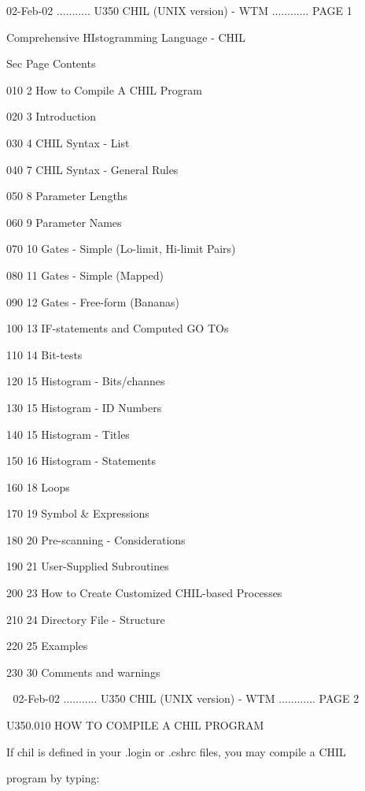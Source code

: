    02-Feb-02 ........... U350  CHIL (UNIX version) - WTM ............ PAGE   1
 
 
                   Comprehensive HIstogramming Language - CHIL
 
 
   Sec Page Contents
 
 
 
   010   2  How to Compile A CHIL Program
 
   020   3  Introduction
 
   030   4  CHIL Syntax - List
 
   040   7  CHIL Syntax - General Rules
 
   050   8  Parameter Lengths
 
   060   9  Parameter Names
 
   070  10  Gates - Simple    (Lo-limit, Hi-limit Pairs)
 
   080  11  Gates - Simple    (Mapped)
 
   090  12  Gates - Free-form (Bananas)
 
   100  13  IF-statements and Computed GO TOs
 
   110  14  Bit-tests
 
   120  15  Histogram - Bits/channes
 
   130  15  Histogram - ID Numbers
 
   140  15  Histogram - Titles
 
   150  16  Histogram - Statements
 
   160  18  Loops
 
   170  19  Symbol & Expressions
 
   180  20  Pre-scanning - Considerations
 
   190  21  User-Supplied Subroutines
 
   200  23  How to Create Customized CHIL-based Processes
 
   210  24  Directory File - Structure
 
   220  25  Examples
 
   230  30  Comments and warnings
 
    
   02-Feb-02 ........... U350  CHIL (UNIX version) - WTM ............ PAGE   2
 
 
 
   U350.010  HOW TO COMPILE A CHIL PROGRAM
 
   If  chil  is defined in your .login or .cshrc files, you may compile a CHIL
 
   program by typing:
 
 
 
